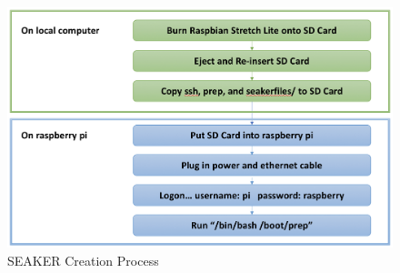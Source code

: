 \documentclass[12pt]{article}
\begin{document}
\begin{figure}[ht]
  \begin{center}
  \includegraphics[width=14cm]{images/SeakerCreation.png}
  \caption{SEAKER Creation Process}
  \label{fig:SeakerCreation}
  \end{center}
\end{figure}
\end{document}
